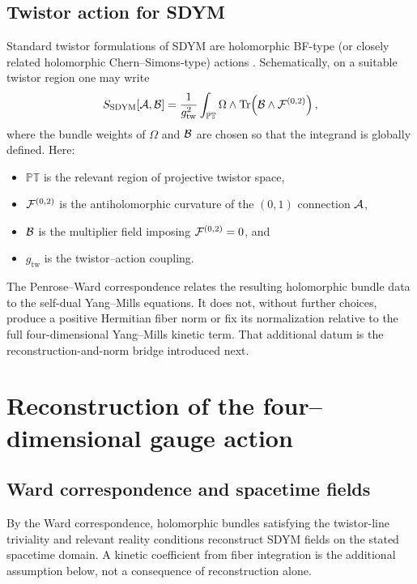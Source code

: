 \documentclass[11pt]{article}
\begin{document}
\subsection{Twistor action for SDYM}

Standard twistor formulations of SDYM are holomorphic BF-type (or closely
related holomorphic Chern--Simons-type) actions
\cite{Mason2005,Movshev2008}. Schematically, on a suitable twistor region one
may write
\[
S_{\mathrm{SDYM}}[{\cal A},{\cal B}]
=
\frac{1}{g_{\mathrm{tw}}^2}
\int_{\mathbb{PT}}
\Omega\wedge\mathrm{Tr}\!\left({\cal B}\wedge{\cal F}^{(0,2)}\right),
\]
where the bundle weights of $\Omega$ and ${\cal B}$ are chosen so that the
integrand is globally defined. Here:
\begin{itemize}
\item $\mathbb{PT}$ is the relevant region of projective twistor space,
\item ${\cal F}^{(0,2)}$ is the antiholomorphic curvature of the $(0,1)$
connection ${\cal A}$,
\item ${\cal B}$ is the multiplier field imposing
${\cal F}^{(0,2)}=0$, and
\item $g_{\mathrm{tw}}$ is the twistor--action coupling.
\end{itemize}

The Penrose--Ward correspondence relates the resulting holomorphic bundle data
to the self-dual Yang--Mills equations. It does not, without further choices,
produce a positive Hermitian fiber norm or fix its normalization relative to
the full four-dimensional Yang--Mills kinetic term. That additional datum is
the reconstruction-and-norm bridge introduced next.

\section{Reconstruction of the four--dimensional gauge action}

\subsection{Ward correspondence and spacetime fields}

By the Ward correspondence, holomorphic bundles satisfying the twistor-line
triviality and relevant reality conditions reconstruct SDYM fields on the
stated spacetime domain. A kinetic coefficient from fiber integration is
the additional assumption below, not a consequence of reconstruction alone.
\end{document}
